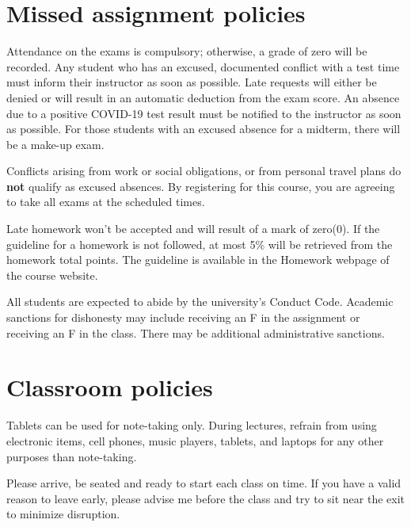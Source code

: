 \documentclass[12pt]{amsart}
\newcommand{\svs}{\vspace{.1cm}}
\begin{document}

\section*{Missed assignment policies}

 Attendance on the exams is compulsory; otherwise, a grade of zero will be recorded. Any student who has an excused, documented conflict with a test time must inform their instructor as soon as possible. Late requests will either be denied or will result in an automatic deduction from the exam score. An absence due to a positive COVID-19 test result must be notified to the instructor as soon as possible. For those students with an excused absence for a midterm, there will be a make-up exam.

Conflicts arising from work or social obligations, or from personal travel plans do \textbf{not} qualify as excused absences. By registering for this course, you are agreeing to take all exams at the scheduled times.

 Late homework won't be accepted and will result of a mark of zero(0). If the guideline for a homework is not followed, at most 5\% will be retrieved from the homework total points. The guideline is available in the Homework webpage of the course website.
\svs

All students are expected to abide by the university's Conduct Code. Academic sanctions for dishonesty may include receiving an F in the assignment or receiving an F in the class. There may be additional administrative sanctions.

\section*{Classroom policies}
Tablets can be used for note-taking only. During lectures, refrain from using electronic items, cell phones, music players, tablets, and laptops for any other purposes than note-taking.

Please arrive, be seated and ready to start each class on time. If you have a valid reason to leave early, please advise me before the class and try to sit near the exit to minimize disruption.
\end{document}
